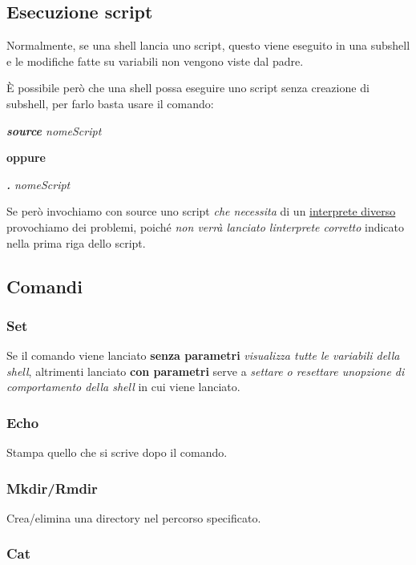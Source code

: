 \subsection{Esecuzione script}\label{esecuzione-script}

Normalmente, se una shell lancia uno script, questo viene eseguito in
una subshell e le modifiche fatte su variabili non vengono viste dal
padre.

È possibile però che una shell possa eseguire uno script senza creazione
di subshell, per farlo basta usare il comando:

\emph{\textbf{source} nomeScript}

\textbf{oppure}

\emph{\textbf{.} nomeScript}

Se però invochiamo con source uno script \emph{che necessita} di un
\ul{interprete diverso} provochiamo dei problemi, poiché \emph{non verrà
lanciato l\textquotesingle interprete corretto} indicato nella prima
riga dello script.

\subsection{Comandi}\label{comandi-1}

\subsubsection{Set}\label{set}

Se il comando viene lanciato \textbf{senza parametri} \emph{visualizza
tutte le variabili della shell}, altrimenti lanciato \textbf{con
parametri} serve a \emph{settare o resettare un\textquotesingle opzione
di comportamento della shell} in cui viene lanciato.

\subsubsection{Echo}\label{echo}

Stampa quello che si scrive dopo il comando.

\subsubsection{Mkdir/Rmdir}\label{mkdirrmdir}

Crea/elimina una directory nel percorso specificato.

\subsubsection{Cat}\label{cat}

